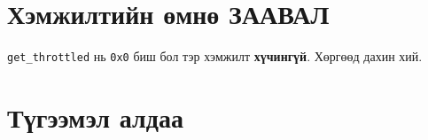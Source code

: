 \hypertarget{ux445ux44dux43cux436ux438ux43bux442ux438ux439ux43d-ux4e9ux43cux43dux4e9-ux437ux430ux430ux432ux430ux43b}{%
\section{Хэмжилтийн өмнө ЗААВАЛ}\label{ux445ux44dux43cux436ux438ux43bux442ux438ux439ux43d-ux4e9ux43cux43dux4e9-ux437ux430ux430ux432ux430ux43b}}

\begin{Shaded}
\begin{Highlighting}[]
\KeywordTok{|}  
\end{Highlighting}
\end{Shaded}

\texttt{get\_throttled} нь \texttt{0x0} биш бол тэр хэмжилт \textbf{хүчингүй}. Хөргөөд дахин хий.

\hypertarget{ux442ux4afux433ux44dux44dux43cux44dux43b-ux430ux43bux434ux430ux430}{%
\section{Түгээмэл алдаа}\label{ux442ux4afux433ux44dux44dux43cux44dux43b-ux430ux43bux434ux430ux430}}

